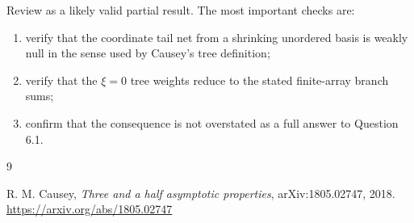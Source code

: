 \documentclass[11pt]{article}
\begin{document}
Review as a likely valid partial result.  The most important checks are:
\begin{enumerate}[label=\arabic*.]
\item verify that the coordinate tail net from a shrinking unordered basis is
      weakly null in the sense used by Causey's tree definition;
\item verify that the $\xi=0$ tree weights reduce to the stated finite-array
      branch sums;
\item confirm that the consequence is not overstated as a full answer to
      Question 6.1.
\end{enumerate}

\begin{thebibliography}{9}

R. M. Causey,
\emph{Three and a half asymptotic properties},
arXiv:1805.02747, 2018.
\url{https://arxiv.org/abs/1805.02747}

\end{thebibliography}
\end{document}

